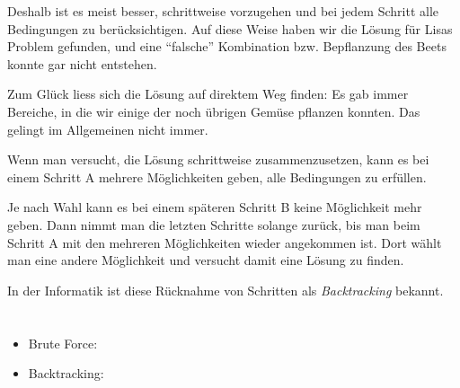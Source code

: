 {{Deshalb ist es meist besser, schrittweise vorzugehen und bei jedem Schritt alle Bedingungen zu berücksichtigen. Auf diese Weise haben wir die Lösung für Lisas Problem gefunden, und eine \enquote{falsche} Kombination bzw. Bepflanzung des Beets konnte gar nicht entstehen.

Zum Glück liess sich die Lösung auf direktem Weg finden: Es gab immer Bereiche, in die wir einige der noch übrigen Gemüse pflanzen konnten. Das gelingt im Allgemeinen nicht immer.

Wenn man versucht, die Lösung schrittweise zusammenzusetzen, kann es bei einem Schritt A mehrere Möglichkeiten geben, alle Bedingungen zu erfüllen.

{\centering%
\par}

Je nach Wahl kann es bei einem späteren Schritt B keine Möglichkeit mehr geben. Dann nimmt man die letzten Schritte solange zurück, bis man beim Schritt A mit den mehreren Möglichkeiten wieder angekommen ist. Dort wählt man eine andere Möglichkeit und versucht damit eine Lösung zu finden.

In der Informatik ist diese Rücknahme von Schritten als \emph{Backtracking} bekannt.



\section*{\BrochureWebsitesAndKeywords}
{\raggedright
\begin{itemize}
  \item Brute Force: \href{https://de.wikipedia.org/wiki/Brute-Force-Methode}{}
  \item Backtracking: \href{https://de.wikipedia.org/wiki/Backtracking}{}
\end{itemize}


}

}{}

}
